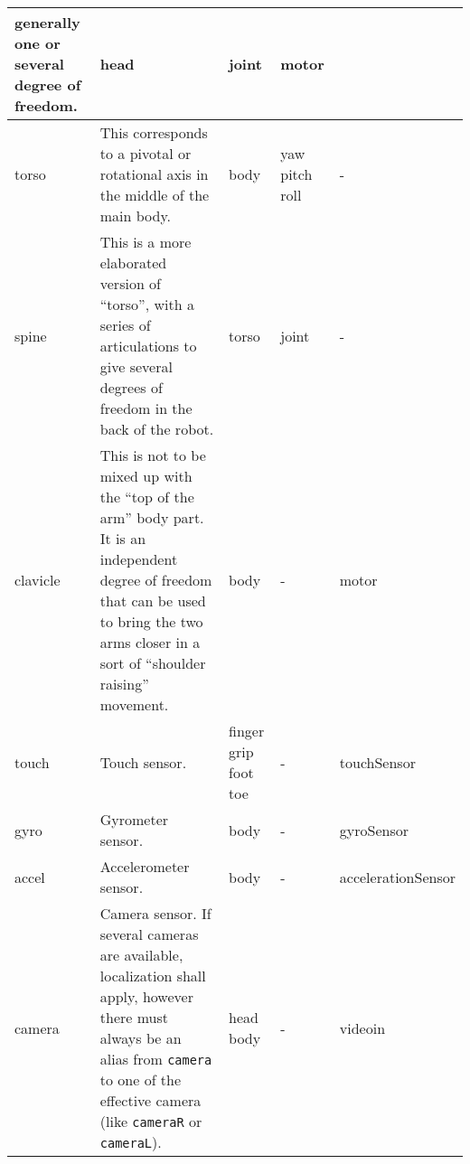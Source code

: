 \documentclass[a4paper]{article}
\begin{document}
\begin{center}
\begin{supertabular}{|m{2.312cm}|m{6.776cm}|m{2.629cm}|m{2.471cm}|m{2.1269999cm}|}
generally one or several degree of freedom. &
\ttfamily head &
\ttfamily joint &
\ttfamily motor\\\hline
{} torso &
\sffamily This corresponds to a pivotal or
rotational axis in the middle of the main body. &
\ttfamily body &
\ttfamily yaw pitch roll &
\ttfamily {}-\\\hline
{} spine &
\sffamily This is a more elaborated version of
“torso”, with a series of articulations to give several degrees of
freedom in the back of the robot. &
\ttfamily torso &
\ttfamily joint &
\ttfamily {}-\\\hline
{} clavicle &
\sffamily This is not to be mixed up with the
“top of the arm” body part. It is an independent degree of freedom that
can be used to bring the two arms closer in a sort of “shoulder
raising” movement. &
\ttfamily body &
\ttfamily {}- &
\ttfamily motor\\\hline
{} touch &
\sffamily Touch sensor. &
\ttfamily finger grip foot toe &
\ttfamily {}- &
\ttfamily touchSensor\\\hline
{} gyro &
\sffamily Gyrometer sensor. &
\ttfamily body &
\ttfamily {}- &
\ttfamily gyroSensor\\\hline
{} accel  &
\sffamily Accelerometer sensor. &
\ttfamily body &
\ttfamily {}- &
\ttfamily accelerationSensor\\\hline
{} camera &
\sffamily Camera sensor. If several cameras are
available, localization shall apply, however there must always be an
alias from \texttt{camera} to one of the effective camera (like
\texttt{cameraR} or \texttt{cameraL}). &
\ttfamily head body &
\ttfamily {}- &
\ttfamily videoin\\\hline

\end{supertabular}
\end{center}
\end{document}
